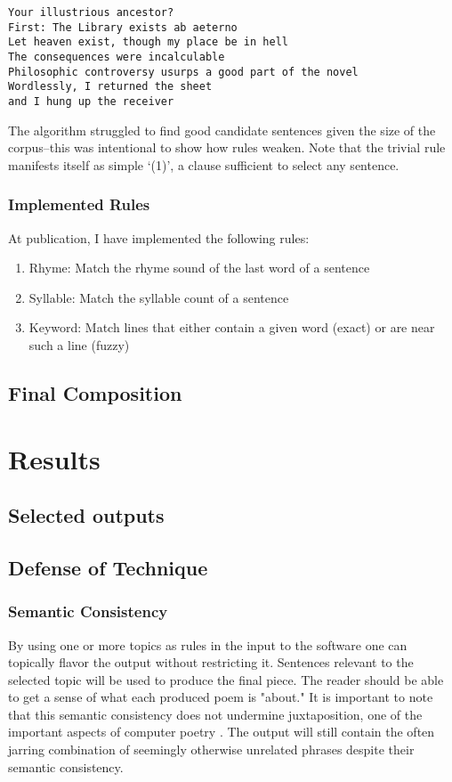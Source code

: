 \documentclass[10pt]{article}
\begin{document}
\begin{verbatim}
Your illustrious ancestor?
First: The Library exists ab aeterno
Let heaven exist, though my place be in hell
The consequences were incalculable
Philosophic controversy usurps a good part of the novel
Wordlessly, I returned the sheet
and I hung up the receiver
\end{verbatim}

The algorithm struggled to find good candidate sentences given the size of the
corpus--this was intentional to show how rules weaken. Note that the trivial
rule manifests itself as simple `(1)', a clause sufficient to select any
sentence.

\subsubsection{Implemented Rules}
At publication, I have implemented the following rules:
\onehalfspacing
\begin{enumerate}
\item Rhyme: Match the rhyme sound of the last word of a sentence
\item Syllable: Match the syllable count of a sentence
\item Keyword: Match lines that either contain a given word (exact) or are near such a line (fuzzy)
\end{enumerate}
\doublespacing

\subsection{Final Composition}
\section{Results}
\subsection{Selected outputs}
\subsection{Defense of Technique}

\subsubsection{Semantic Consistency}
By using one or more topics as rules in the input to the software one can
topically flavor the output without restricting it. Sentences relevant to the
selected topic will be used to produce the final piece. The reader should be
able to get a sense of what each produced poem is "about." It is important to
note that this semantic consistency does not undermine juxtaposition, one of
the important aspects of computer poetry \cite{Hart96}. The output will still
contain the often jarring combination of seemingly otherwise unrelated phrases
despite their semantic consistency.
\end{document}
